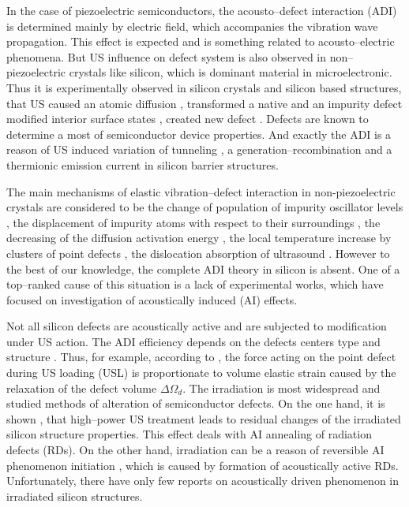 \documentclass[aip,jap,reprint]{revtex4-1}
\begin{document}
In the case of piezoelectric semiconductors, the acousto--defect interaction (ADI) is determined mainly by electric field, which accompanies the vibration wave propagation.
This effect is expected and is something related to acousto--electric phenomena.
But US influence on defect system is also observed in non--piezoelectric crystals like silicon, which is dominant material in microelectronic.
Thus it is experimentally observed in silicon crystals and silicon based structures, that US
caused an atomic diffusion \cite{Roman:2010JAP,Roman:2007APL},
transformed a native and an impurity defect \cite{Ostapenko1994,Korotchenkov1995,Olikh2009Sem,Ostapenko1995,Ostrovskii2001}
modified  interior surface states \cite{Medvids,Zaver:2008,Mirsagatov},
created new defect \cite{Savkina2015,Virot}.
Defects are known to determine a most of semiconductor device properties.
And exactly the ADI is a reason of US induced variation of tunneling \cite{Olikh2016JSem,Olikh2011Sem}, a generation--recombination \cite{Davletova2009,Davletova2008,YOlikh2005} and  a thermionic emission \cite{OlikhJAP,Olikh:Ultras} current in silicon barrier structures.

The main mechanisms of elastic vibration--defect interaction in non-piezoelectric crystals are considered to be
the  change  of  population  of  impurity  oscillator  levels  \cite{Pavlovich},
the displacement of impurity atoms with respect to their surroundings \cite{Korotchenkov1995,MirzadeJAP2011,PeleshchakUJF2016},
the decreasing of the diffusion activation  energy \cite{Krevchik},
the local temperature increase by clusters of point defects \cite{MirzadeJAP2005},
the dislocation absorption of ultrasound \cite{Davletova2008,OstrovKor92,Olikh:Ultras2016}.
However to the best of our knowledge, the complete ADI theory in silicon is absent.
One of a top--ranked cause of  this situation is a lack of experimental works, which have focused on investigation of acoustically induced (AI) effects.

Not all silicon defects are acoustically active and are subjected to modification under US action.
The ADI efficiency depends on the defects centers type and structure \cite{Medvids}.
Thus, for example, according to \cite{MirzadeJAP2011,PeleshchakUJF2016}, the force acting on the point defect during US loading (USL) is proportionate to volume elastic strain caused by the relaxation of the defect volume $\Delta\Omega_d$.
The irradiation is most widespread and studied methods of alteration of semiconductor defects.
On the one hand, it is shown \cite{YOlikh2007TPL,Parchinskii2006,Gorb2010,Podolian2012}, that high--power US treatment leads to residual changes of the irradiated silicon structure properties.
This effect deals with AI annealing of radiation defects (RDs).
On the other hand, irradiation can be a reason of reversible AI phenomenon initiation \cite{YOlikh2006TPL,YOlikhTPL2011}, which is caused by formation of acoustically active RDs.
Unfortunately, there have only few reports on acoustically driven phenomenon in irradiated silicon structures.
\end{document}
